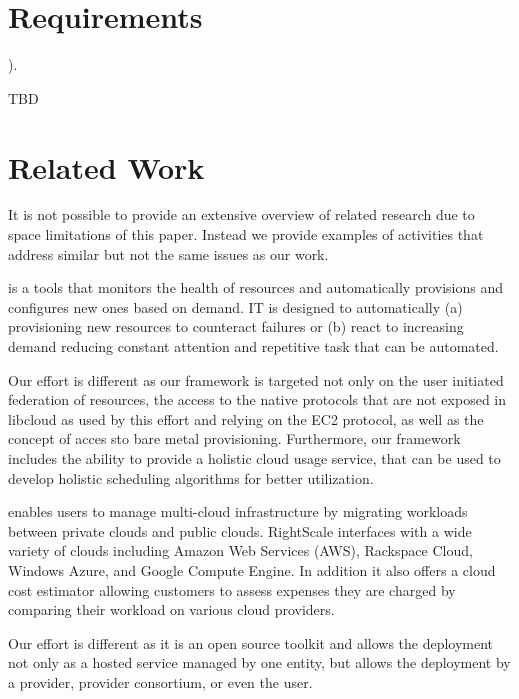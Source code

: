 \documentclass{tex/sig-alternate-2013}
\newcommand{\todo}[1]{{\color{red}{#1}}}
\begin{document}
\section{Requirements} \label{S:requirements}).


TBD


\section{Related Work}\label{S:related}

\todo{READ}
It is not possible to provide an extensive overview of related
research due to space limitations of this paper. Instead we provide
examples of activities that address similar but not the same issues
as our work.

\begin{description}[leftmargin=0pt,itemsep=0pt,topsep=0pt]

\item[Phantom] \cite{phantom12,www-phantom} is a tools that monitors
  the health of resources and automatically provisions and configures
  new ones based on demand. IT is designed to automatically (a)
  provisioning new resources to counteract failures or (b) react to
  increasing demand reducing constant attention and repetitive task
  that can be automated.  

  Our effort is different as our framework is targeted not only on the
  user initiated federation of resources, the access to the native
  protocols that are not exposed in libcloud as used by this effort
  and relying on the EC2 protocol, as well as the concept of acces sto
  bare metal provisioning. Furthermore, our framework includes the
  ability to provide a holistic cloud usage service, that can be used
  to develop holistic scheduling algorithms for better utilization.

\item[RightScale] \cite{Rightscale} enables users to manage
  multi-cloud infrastructure by migrating workloads between private
  clouds and public clouds. RightScale interfaces with a wide variety
  of clouds including Amazon Web Services (AWS), Rackspace Cloud,
  Windows Azure, and Google Compute Engine. In addition it also offers
  a cloud cost estimator allowing customers to assess expenses they
  are charged by comparing their workload on various cloud providers.

  Our effort is different as it is an open source toolkit and allows
  the deployment not only as a hosted service managed by one entity,
  but allows the deployment by a provider, provider consortium, or
  even the user. 


\end{description}
\end{document}
